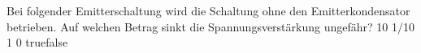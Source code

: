     {Bei folgender Emitterschaltung wird die Schaltung ohne den Emitterkondensator betrieben. Auf welchen Betrag sinkt die Spannungsverstärkung ungefähr?}
    {10}
    {1/10}
    {1}
    {0}
    {true}{false}